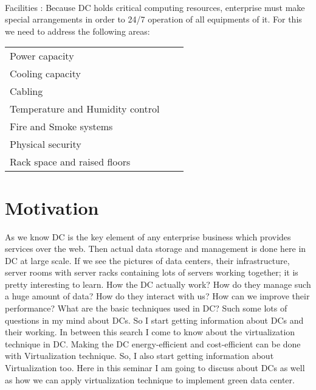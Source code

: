 \documentclass[12pt,a4paper]{report}
\begin{document}
\\Facilities : Because DC holds critical computing resources, enterprise must make special arrangements in order to 24/7 operation of all equipments of it. For this we need to address the following areas:\\
\begin{tabular}{lll}
\vspace{0.1 in}
Power capacity & \\
\vspace{0.1 in}
Cooling capacity & \\
\vspace{0.1 in}
Cabling & \\
\vspace{0.1 in}
 Temperature and Humidity control& \\
\vspace{0.1 in}
 Fire and Smoke systems & \\
 \vspace{0.1 in}
 Physical security & \\
 \vspace{0.1 in}
 Rack space and raised floors & \\
\end{tabular}


\section{Motivation }
As we know DC is the key element of any enterprise business which provides services over the web. Then actual data storage and management is done here in DC at large scale. If we see the pictures of data centers, their infrastructure, server rooms with server racks containing lots of servers working together; it is pretty interesting to learn. How the DC actually work? How do they manage such a huge amount of data? How do they interact with us? How can we improve their performance? What are the basic techniques used in DC? Such some lots of questions in my mind about DCs. So I start getting information about DCs and their working. In between this search I come to know about the virtualization technique in DC. Making the DC energy-efficient and cost-efficient can be done with Virtualization technique. So, I also start getting information about Virtualization too. Here in this seminar I am going to discuss about DCs as well as how we can apply virtualization technique to implement green data center.
\end{document}
